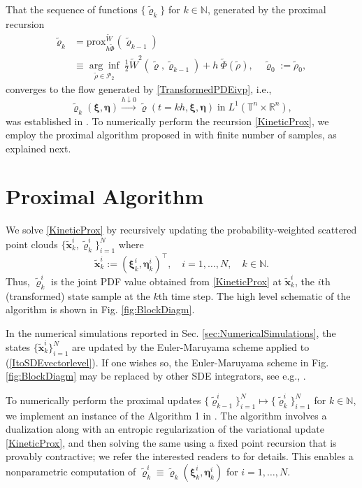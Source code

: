 \documentclass[10pt,twocolumn]{IEEEtran}
\begin{document}
That the sequence of functions $\{\tilde{\varrho}_{k}\}$ for $k\in\mathbb{N}$, generated by the proximal recursion
\begin{align}
\tilde{\varrho}_{k} &= {\text{prox}}^{\widetilde{W}}_{h\widetilde{\Phi}}(\tilde{\varrho}_{k-1}) \nonumber\\
&\equiv \underset{\tilde{\rho}\in\mathcal{P}_{2}}{\arg\inf}\:\frac{1}{2}\widetilde{W}^{2}\left(\tilde{\varrho},\tilde{\varrho}_{k-1}\right) + h\:\widetilde{\Phi}(\tilde{\rho}), \quad \tilde{\varrho}_{0} := \tilde{\rho}_{0},
\label{KineticProx}	
\end{align}
converges to the flow generated by \eqref{TransformedPDEivp}, i.e., 
$$\tilde{\varrho}_{k}(\bm{\xi},\bm{\eta}) \xrightarrow{h\downarrow 0} \tilde{\varrho}(t=kh,\bm{\xi},\bm{\eta})\;\text{in}\;L^{1}\left(\mathbb{T}^{n}\times\mathbb{R}^{n}\right),$$
was established in \cite{duong2014conservative}. To numerically perform the recursion \eqref{KineticProx}, we employ the proximal algorithm proposed in \cite{caluya2019TAC} with finite number of samples, as explained next.







\section{Proximal Algorithm}\label{sec:ProxAlgo}
We solve \eqref{KineticProx} by recursively updating the probability-weighted scattered point clouds $\{\tilde{\bm{x}}_{k}^{i},\tilde{\varrho}_{k}^{i}\}_{i=1}^{N}$ where 
$$\tilde{\bm{x}}_{k}^{i}:=\left(\bm{\xi}_{k}^{i},\bm{\eta}_{k}^{i}\right)^{\!\top}, \quad i=1,\hdots,N, \quad k\in\mathbb{N}.$$
Thus, $\tilde{\varrho}_{k}^{i}$ is the joint PDF value obtained from \eqref{KineticProx} at $\tilde{\bm{x}}_{k}^{i}$, the $i$th (transformed) state sample at the $k$th time step. The high level schematic of the algorithm is shown in Fig. \ref{fig:BlockDiagm}. 


In the numerical simulations reported in Sec. \ref{sec:NumericalSimulations}, the states $\{\tilde{\bm{x}}_{k}^{i}\}_{i=1}^{N}$ are updated by the Euler-Maruyama scheme applied to (\ref{ItoSDEvectorlevel}). If one wishes so, the Euler-Maruyama scheme in Fig. \ref{fig:BlockDiagm} may be replaced by other SDE integrators, see e.g., \cite[Sec. III.B.2, Remark 1]{caluya2019TAC}. 

To numerically perform the proximal updates $\{\tilde{\varrho}_{k-1}^{i}\}_{i=1}^{N}\mapsto\{\tilde{\varrho}_{k}^{i}\}_{i=1}^{N}$ for $k\in\mathbb{N}$, we implement an instance of the Algorithm 1 in \cite{caluya2019TAC}. The algorithm involves a dualization along
with an entropic regularization of the variational update \eqref{KineticProx}, and then solving the same using a fixed point recursion that is provably contractive; we refer the interested readers to \cite[Sec. V.B]{caluya2019TAC} for details. This enables a nonparametric computation of $\tilde{\varrho}_{k}^{i} \equiv \tilde{\varrho}_{k}\left(\bm{\xi}_{k}^{i},\bm{\eta}_{k}^{i}\right)$ for $i=1,\hdots,N$.
\end{document}

